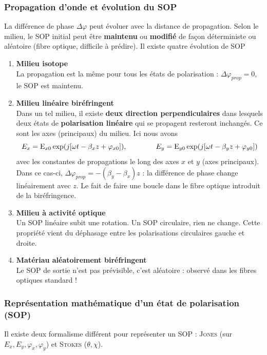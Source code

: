	
	\subsubsection{Propagation d'onde et évolution du SOP}
	La différence de phase $\Delta\varphi$ peut évoluer avec la distance de propagation. Selon le
	milieu, le SOP initial peut être \textbf{maintenu} ou \textbf{modifié} de façon déterministe ou
	aléatoire (fibre optique, difficile à prédire). Il existe quatre évolution de SOP
	\begin{enumerate}
	\item \textbf{Milieu isotope}\\
	La propagation est la même pour tous les états de polarisation : $\Delta \varphi_{prop}=0$, le
	SOP est maintenu.
	\item \textbf{Milieu linéaire biréfringent}\\
	Dans un tel milieu, il existe \textbf{deux direction perpendiculaires} dans lesquels deux états
	de \textbf{polarisation linéaire} qui se propagent resteront inchangés. Ce sont les axes 
	(principaux) du milieu. Ici nous avons
	\begin{equation}
	{E_x} = {{\rm{E}}_{x0}}\exp (j[\omega t - {\beta _x}z + {\varphi _{x0}}]),\qquad\qquad
	{E_y} = {{\rm{E}}_{y0}}\exp (j[\omega t - {\beta _y}z + {\varphi _{y0}}])
	\end{equation}
	avec les constantes de propagations le long des axes $x$ et $y$ (axes principaux). Dans ce cas-ci,
	$\Delta\varphi_{prop} = -(\beta_y-\beta_x)z$ : la différence de phase change linéairement avec
	 $z$. Le fait de faire une boucle dans le fibre optique introduit de la biréfringence.
	
	\item \textbf{Milieu à activité optique}\\
	Un SOP linéaire subit une rotation. Un SOP circulaire, rien ne change. Cette propriété vient du 
	déphasage entre les polarisations circulaires gauche et droite.
	
	\item \textbf{Matériau aléatoirement biréfringent}\\
	Le SOP de sortie n'est pas prévisible, c'est aléatoire : observé dans les fibres optiques 
	standard !	
	\end{enumerate}
	
	\subsubsection{Représentation mathématique d'un état de polarisation (SOP)}
	Il existe deux formalisme différent pour représenter un SOP : \textsc{Jones} (sur $E_x,E_y, 
	\varphi_x, \varphi_y$) et \textsc{Stokes} ($\theta, \chi$).\\
	
